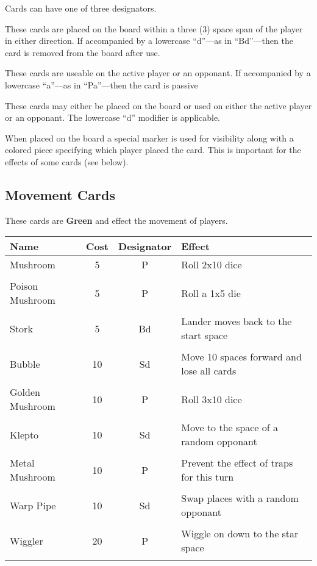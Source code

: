 \documentclass{article}
\begin{document}
\noindent
Cards can have one of three designators.

\begin{description}[style=nextline]
\item[Board (B)]
These cards are placed on the board within a three (3) space span
of the player in either direction.  If accompanied by a lowercase
``d''---as in ``Bd''---then the card is removed from the board after use.

\item[Player (P)]
These cards are useable on the active player or an opponant.
If accompanied by a lowercase ``a''---as in ``Pa''---then the card is passive

\item[Both (S)]
These cards may either be placed on the board or used on either
the active player or an opponant. The lowercase ``d'' modifier is applicable.
\end{description}


\noindent
When placed on the board a special marker is used for visibility along with a
colored piece specifying which player placed the card.  This is important for
the effects of some cards (see below).

\subsection{Movement Cards}

These cards are \textbf{Green} and effect the movement of players.
\vspace{2ex}

\begin{tabular}{lccp{5cm}}
\textbf{Name} & \textbf{Cost} & \textbf{Designator} & \textbf{Effect} \\
\hline
Mushroom & 5 & P & Roll 2x10 dice \\
&&& \\
Poison Mushroom & 5 & P & Roll a 1x5 die \\
&&& \\
Stork & 5 & Bd & Lander moves back to the start space \\
&&& \\
Bubble & 10 & Sd & Move 10 spaces forward and lose all cards \\
&&& \\
Golden Mushroom & 10 & P & Roll 3x10 dice \\
&&& \\
Klepto & 10 & Sd & Move to the space of a random opponant \\
&&& \\
Metal Mushroom & 10 & P & Prevent the effect of traps for this turn \\
&&& \\
Warp Pipe & 10 & Sd & Swap places with a random opponant \\
&&& \\
Wiggler & 20 & P & Wiggle on down to the star space \\
&&& \\
\end{tabular}
\end{document}
